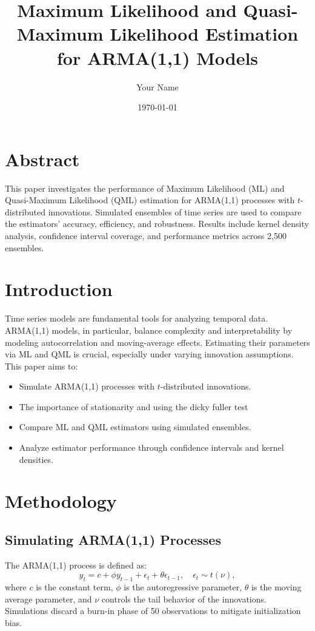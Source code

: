 \documentclass[a4paper,12pt]{article}
\title{Maximum Likelihood and Quasi-Maximum Likelihood Estimation for ARMA(1,1) Models}
\author{Your Name}
\date{\today}
\begin{document}
\maketitle

\section*{Abstract}
This paper investigates the performance of Maximum Likelihood (ML) and Quasi-Maximum Likelihood (QML) estimation for ARMA(1,1) processes with \(t\)-distributed innovations. Simulated ensembles of time series are used to compare the estimators' accuracy, efficiency, and robustness. Results include kernel density analysis, confidence interval coverage, and performance metrics across 2,500 ensembles.

\section{Introduction}
Time series models are fundamental tools for analyzing temporal data. ARMA(1,1) models, in particular, balance complexity and interpretability by modeling autocorrelation and moving-average effects. Estimating their parameters via ML and QML is crucial, especially under varying innovation assumptions. This paper aims to:
\begin{itemize}
    \item Simulate ARMA(1,1) processes with \(t\)-distributed innovations.
    \item The importance of stationarity and using the dicky fuller test
    \item Compare ML and QML estimators using simulated ensembles.
    \item Analyze estimator performance through confidence intervals and kernel densities.
\end{itemize}

\section{Methodology}
\subsection{Simulating ARMA(1,1) Processes}
The ARMA(1,1) process is defined as:
\[
y_t = c + \phi y_{t-1} + \epsilon_t + \theta \epsilon_{t-1}, \quad \epsilon_t \sim t(\nu),
\]
where \(c\) is the constant term, \(\phi\) is the autoregressive parameter, \(\theta\) is the moving average parameter, and \(\nu\) controls the tail behavior of the innovations. Simulations discard a burn-in phase of 50 observations to mitigate initialization bias.
\end{document}
